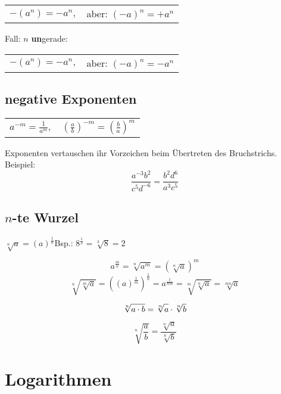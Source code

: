 \begin{multicols}{2}
\begin{tabular}{cc}
 $-(a^n) = -a^n,$ & aber: $(-a)^n = +a^n$
 \end{tabular} 

Fall: $n$ \textbf{un}gerade:

\begin{tabular}{cc}
 $-(a^n) = -a^n,$ & aber: $(-a)^n = -a^n$
 \end{tabular} 


\subsection*{negative Exponenten}


\begin{tabular}{cc}
$a^{-m} = \frac1{a^m},$ & $\left(\frac{a}b\right)^{-m} = \left(\frac{b}a\right)^m$
 \end{tabular}

Exponenten vertauschen ihr Vorzeichen beim Übertreten des
Bruchstrichs. Beispiel:
$$\frac{a^{-3}b^2}{c^5d^{-6}} = \frac{b^2d^6}{a^3c^5}$$


\subsection*{$n$-te Wurzel}
$\sqrt[n]{a} = \left(a\right)^\frac1n$\hfill{}Bsp.: $8^{\frac13}=\sqrt[3]{8}=2$

\begin{tcolorbox}[colback=white]
$$a^{\frac{m}n} = \sqrt[n]{a^m} = \left(\sqrt[n]a\right)^m$$
$$\sqrt[n]{\sqrt[m]{a}}   = \left((a)^\frac1m \right)^\frac1n =
  a^\frac1{nm} = \sqrt[m]{\sqrt[n]{a}}   = \sqrt[mn]{a}$$

  $$\sqrt[n]{a\cdot{}b} = \sqrt[n]{\vphantom{b}a} \cdot \sqrt[n]b$$

  $$\sqrt[n]{\frac{a}{b}} = \frac{\sqrt[n]a}{\sqrt[n]b}$$
\end{tcolorbox}

 
\hrulefill
\section*{Logarithmen}
\headerUndFooterJedeSeite{}


\end{multicols}
